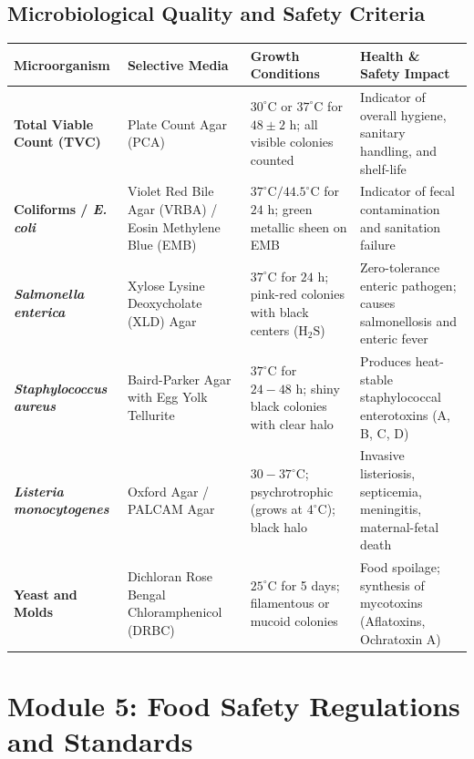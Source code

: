 \documentclass[11pt,a4paper,oneside]{article}
\begin{document}
\subsection{Microbiological Quality and Safety Criteria}

\begin{center}
\begin{tabular}{@{}p{3.0cm} p{3.8cm} p{3.8cm} p{4.8cm}@{}}
\toprule
\textbf{Microorganism} & \textbf{Selective Media} & \textbf{Growth Conditions} & \textbf{Health \& Safety Impact} \tabularnewline
\midrule
\textbf{Total Viable Count (TVC)} & Plate Count Agar (PCA) & $30^\circ\text{C}$ or $37^\circ\text{C}$ for $48\pm 2\text{ h}$; all visible colonies counted & Indicator of overall hygiene, sanitary handling, and shelf-life \tabularnewline
\textbf{Coliforms / \textit{E. coli}} & Violet Red Bile Agar (VRBA) / Eosin Methylene Blue (EMB) & $37^\circ\text{C} / 44.5^\circ\text{C}$ for $24\text{ h}$; green metallic sheen on EMB & Indicator of fecal contamination and sanitation failure \tabularnewline
\textbf{\textit{Salmonella enterica}} & Xylose Lysine Deoxycholate (XLD) Agar & $37^\circ\text{C}$ for $24\text{ h}$; pink-red colonies with black centers ($\mathrm{H_2S}$) & Zero-tolerance enteric pathogen; causes salmonellosis and enteric fever \tabularnewline
\textbf{\textit{Staphylococcus aureus}} & Baird-Parker Agar with Egg Yolk Tellurite & $37^\circ\text{C}$ for $24-48\text{ h}$; shiny black colonies with clear halo & Produces heat-stable staphylococcal enterotoxins (A, B, C, D) \tabularnewline
\textbf{\textit{Listeria monocytogenes}} & Oxford Agar / PALCAM Agar & $30-37^\circ\text{C}$; psychrotrophic (grows at $4^\circ\text{C}$); black halo & Invasive listeriosis, septicemia, meningitis, maternal-fetal death \tabularnewline
\textbf{Yeast and Molds} & Dichloran Rose Bengal Chloramphenicol (DRBC) & $25^\circ\text{C}$ for 5 days; filamentous or mucoid colonies & Food spoilage; synthesis of mycotoxins (Aflatoxins, Ochratoxin A) \tabularnewline
\bottomrule
\end{tabular}
\end{center}

\newpage

\section{Module 5: Food Safety Regulations and Standards}
\end{document}
